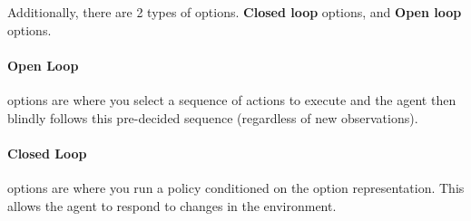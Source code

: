 \documentclass{article}
\begin{document}
\pagebreak
Additionally, there are 2 types of options. {\bf Closed loop} options, and {\bf Open loop} options.
\paragraph{Open Loop} options are where you select a sequence of actions to execute and the agent then blindly follows this pre-decided sequence (regardless of new observations).
\paragraph{Closed Loop} options are where you run a policy conditioned on the option representation. This allows the agent to respond to changes in the environment.
\end{document}
